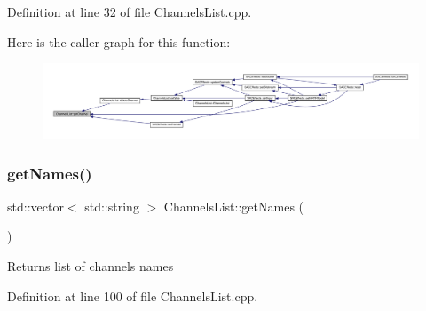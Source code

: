 Definition at line 32 of file Channels\+List.\+cpp.

Here is the caller graph for this function\+:
\nopagebreak
\begin{figure}[H]
\begin{center}
\leavevmode
\includegraphics[width=350pt]{class_channels_list_a794574bee033fd0fa2bee54c615576f9_icgraph}
\end{center}
\end{figure}
\mbox{\label{class_channels_list_a17482d918a0dbbd4bf0fc2a22ee67668}} 
\subsubsection{\texorpdfstring{get\+Names()}{getNames()}}
{\footnotesize\ttfamily std\+::vector$<$ std\+::string $>$ Channels\+List\+::get\+Names (\begin{DoxyParamCaption}{ }\end{DoxyParamCaption})}

\begin{DoxyReturn}{Returns}
list of channels names 
\end{DoxyReturn}


Definition at line 100 of file Channels\+List.\+cpp.

